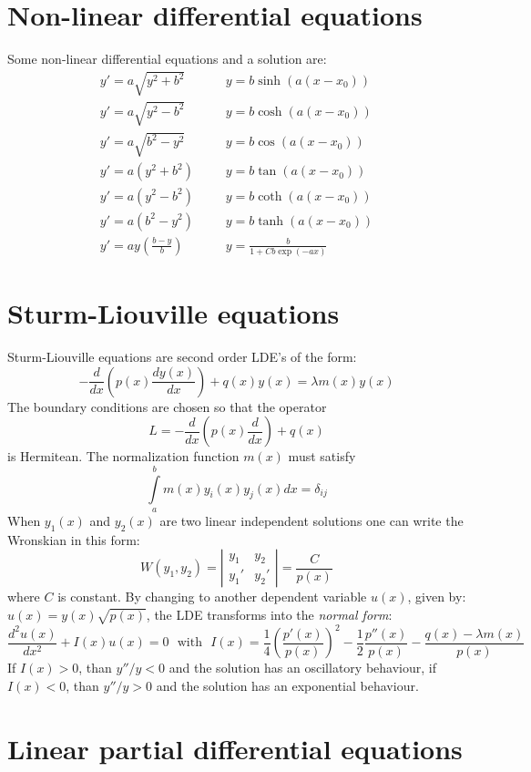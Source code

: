 \documentclass[a4paper,fancyheadings,twoside]{report}
\begin{document}
\section{Non-linear differential equations}
Some non-linear differential equations and a solution are:
\[
\begin{array}{lll}
y'=a\sqrt{y^2+b^2}&~~~~&y=b\sinh(a(x-x_0))\\
y'=a\sqrt{y^2-b^2}&~~~~&y=b\cosh(a(x-x_0))\\
y'=a\sqrt{b^2-y^2}&~~~~&y=b\cos(a(x-x_0))\\
y'=a(y^2+b^2)     &~~~~&y=b\tan(a(x-x_0))\\
y'=a(y^2-b^2)     &~~~~&y=b\coth(a(x-x_0))\\
y'=a(b^2-y^2)     &~~~~&y=b\tanh(a(x-x_0))\\
\displaystyle y'=ay\left(\frac{b-y}{b}\right)&~~~~&\displaystyle y=\frac{b}{1+Cb\exp(-ax)}
\end{array}
\]

\section{Sturm-Liouville equations}
Sturm-Liouville equations are second order LDE's of the form:
\[
-\frac{d}{dx}\left(p(x)\frac{dy(x)}{dx}\right)+q(x)y(x)=\lambda m(x)y(x)
\]
The boundary conditions are chosen so that the operator
\[
L=-\frac{d}{dx}\left(p(x)\frac{d}{dx}\right)+q(x)
\]
is Hermitean. The normalization function $m(x)$ must satisfy
\[
\int\limits_a^bm(x)y_i(x)y_j(x)dx=\delta_{ij}
\]
When $y_1(x)$ and $y_2(x)$ are two linear independent solutions one can write
the Wronskian in this form:
\[
W(y_1,y_2)=\left|\begin{array}{cc}y_1&y_2\\ y_1'&y_2' \end{array}\right|=
\frac{C}{p(x)}
\]
where $C$ is constant. By changing to another dependent variable $u(x)$,
given by: $u(x)=y(x)\sqrt{p(x)}$, the LDE transforms into the
{\it normal form}:
\[
\frac{d^2u(x)}{dx^2}+I(x)u(x)=0~~~\mbox{with}~~~
I(x)=\frac{1}{4}\left(\frac{p'(x)}{p(x)}\right)^2-\frac{1}{2}\frac{p''(x)}{p(x)}-\frac{q(x)-\lambda m(x)}{p(x)}
\]
If $I(x)>0$, than $y''/y<0$ and the solution has an oscillatory behaviour,
if $I(x)<0$, than $y''/y>0$ and the solution has an exponential behaviour.

\section{Linear partial differential equations}
\end{document}
